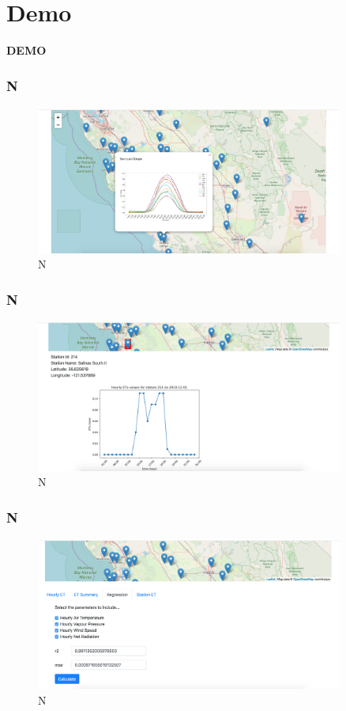 \section{Demo}
\begin{frame}
	\begin{center}
		{\fontsize{20}{20}\selectfont
			\textbf{DEMO}
		}
	\end{center}
\end{frame}

\begin{frame}
	\frametitle{N}
	\centering
	\begin{figure}
		\includegraphics[width=0.9\textwidth]{images/fig1.png}
		\caption{N}\label{fig:2-2016}
	\end{figure}
\end{frame}

\begin{frame}
	\frametitle{N}
	\centering
	\begin{figure}
		\includegraphics[width=0.9\textwidth]{images/fig2.png}
		\caption{N}\label{fig:2-2016}
	\end{figure}
\end{frame}

\begin{frame}
	\frametitle{N}
	\centering
	\begin{figure}
		\includegraphics[width=0.9\textwidth]{images/fig3.png}
		\caption{N}\label{fig:2-2016}
	\end{figure}
\end{frame}

